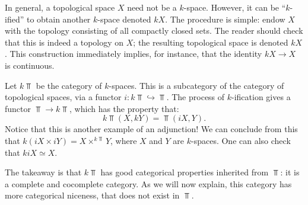 In general, a topological space $X$ need not be a $k$-space.
However, it can be ``$k$-ified'' to obtain another $k$-space denoted $kX$.
The procedure is simple: endow $X$ with the topology consisting of all compactly closed sets.
The reader should check that this is indeed a topology on $X$;
the resulting topological space is denoted $kX$.
This construction immediately implies, for instance, that the identity $kX\to X$ is continuous.

Let $k\Top$ be the category of $k$-spaces.
This is a subcategory of the category of topological spaces, via a functor $i:k\Top\hookrightarrow \Top$.
The process of $k$-ification gives a functor $\Top\to k\Top$, which has the property that:
$$k\Top(X,kY)=\Top(iX,Y).$$
Notice that this is another example of an adjunction!
We can conclude from this that $k(iX\times iY)=X\times^{k\Top}Y$, where $X$ and $Y$ are $k$-spaces.
One can also check that $kiX\simeq X$.

The takeaway is that $k\Top$ has good categorical properties inherited from $\Top$:
it is a complete and cocomplete category.
As we will now explain, this category has more categorical niceness, that does not exist in $\Top$.

